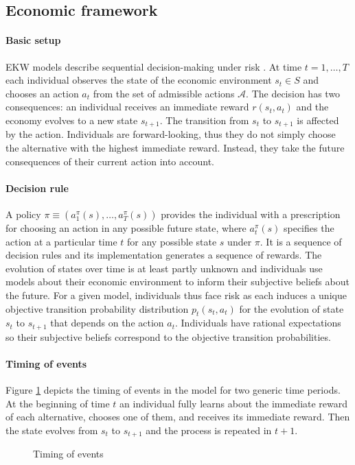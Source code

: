 \subsection{Economic framework}
\paragraph{Basic setup} EKW models describe sequential decision-making under risk \citep{Machina.2014,Gilboa.2009}. At time $t = 1, \hdots, T$ each individual observes the state of the economic environment $s_t\in S$ and chooses an action $a_t$ from the set of admissible actions $\mathcal{A}$. The decision has two consequences: an individual receives an immediate reward $r(s_t, a_t)$ and the economy evolves to a new state $s_{t + 1}$. The transition from $s_t$ to $s_{t + 1}$ is affected by the action.  Individuals are forward-looking, thus they do not simply choose the alternative with the highest immediate reward. Instead, they take the future consequences of their current action into account.

\paragraph{Decision rule} A policy $\pi \equiv(a^\pi_1(s), \hdots, a^\pi_T(s))$ provides the individual with a prescription for choosing an action in any possible future state, where $a^\pi_t(s)$ specifies the action at a particular time $t$ for any possible state $s$ under $\pi$. It is a sequence of decision rules and its implementation generates a sequence of rewards.  The evolution of states over time is at least partly unknown and individuals use models about their economic environment to inform their subjective beliefs about the future. For a given model, individuals thus face risk as each induces a unique objective transition probability distribution $p_t(s_t, a_t)$ for the evolution of state $s_t$ to $s_{t + 1}$ that depends on the action $a_t$. Individuals have rational expectations \citep{Muth.1961,Lucas.1972} so their subjective beliefs correspond to the objective transition probabilities.

\paragraph{Timing of events} Figure \ref{Timing} depicts the timing of events in the model for two generic time periods. At the beginning of time $t$ an individual fully learns about the immediate reward of each alternative, chooses one of them, and receives its immediate reward. Then the state evolves from $s_t$ to $s_{t + 1}$ and the process is repeated in $t + 1$.
%
\begin{figure}\caption{Timing of events}\label{Timing}\vspace{1.0cm}\centering

\end{figure}
%
